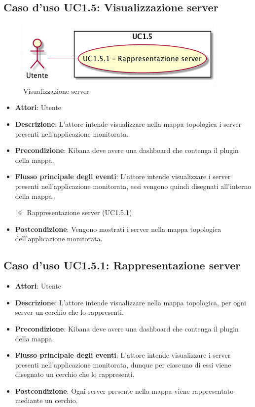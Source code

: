 \subsection{Caso d'uso UC1.5: Visualizzazione server}
\begin{figure} [H]
	\centering
	\includegraphics[scale=0.45]{./UC/UC1-5.png}
	\caption{Visualizzazione server}\label{}
\end{figure}
\begin{itemize}
	\item \textbf{Attori}: Utente
	\item \textbf{Descrizione}: L'attore intende visualizzare nella mappa topologica i server presenti nell'applicazione monitorata.
	\item \textbf{Precondizione}: Kibana deve avere una dashboard che contenga il plugin della mappa.
	
	\item \textbf{Flusso principale degli eventi}: L'attore intende visualizzare i server presenti nell'applicazione monitorata, essi vengono quindi disegnati all'interno della mappa.
	\begin{itemize}
		\item Rappresentazione server (UC1.5.1)
	\end{itemize}
	\item \textbf{Postcondizione}: Vengono mostrati i server nella mappa topologica dell'applicazione monitorata.
\end{itemize}
\subsection{Caso d'uso UC1.5.1: Rappresentazione server}
\begin{itemize}
	\item \textbf{Attori}: Utente
	\item \textbf{Descrizione}: L'attore intende visualizzare nella mappa topologica, per ogni server un cerchio che lo rappresenti.
	\item \textbf{Precondizione}: Kibana deve avere una dashboard che contenga il plugin della mappa.
	\item \textbf{Flusso principale degli eventi}: L'attore intende visualizzare i server presenti nell'applicazione monitorata, dunque per ciascuno di essi viene disegnato un cerchio che lo rappresenti.
	\item \textbf{Postcondizione}: Ogni server presente nella mappa viene rappresentato mediante un cerchio.
\end{itemize}

